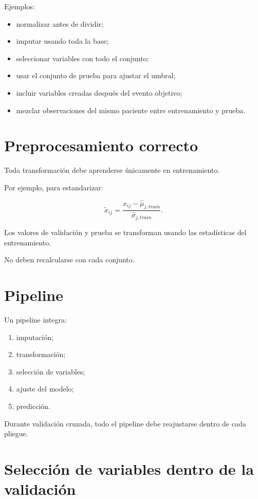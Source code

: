 \documentclass[
  spanish,
  11pt,
  letterpaper,
  DIV=11,
  numbers=noendperiod]{scrreprt}
\providecommand{\tightlist}{%
  \setlength{\itemsep}{0pt}\setlength{\parskip}{0pt}}
\theoremstyle{definition}
\theoremstyle{plain}
\theoremstyle{definition}
\theoremstyle{remark}
\begin{document}
Ejemplos:

\begin{itemize}
\tightlist
\item
  normalizar antes de dividir;
\item
  imputar usando toda la base;
\item
  seleccionar variables con todo el conjunto;
\item
  usar el conjunto de prueba para ajustar el umbral;
\item
  incluir variables creadas después del evento objetivo;
\item
  mezclar observaciones del mismo paciente entre entrenamiento y prueba.
\end{itemize}

\section{Preprocesamiento correcto}\label{preprocesamiento-correcto}

Toda transformación debe aprenderse únicamente en entrenamiento.

Por ejemplo, para estandarizar:

\[
\widetilde{x}_{ij}
=
\frac{
x_{ij}-\widehat{\mu}_{j,train}
}{
\widehat{\sigma}_{j,train}
}.
\]

Los valores de validación y prueba se transforman usando las
estadísticas del entrenamiento.

No deben recalcularse con cada conjunto.

\section{Pipeline}\label{pipeline}

Un pipeline integra:

\begin{enumerate}
\def\labelenumi{\arabic{enumi}.}
\tightlist
\item
  imputación;
\item
  transformación;
\item
  selección de variables;
\item
  ajuste del modelo;
\item
  predicción.
\end{enumerate}

Durante validación cruzada, todo el pipeline debe reajustarse dentro de
cada pliegue.

\section{Selección de variables dentro de la
validación}\label{selecciuxf3n-de-variables-dentro-de-la-validaciuxf3n}
\end{document}
